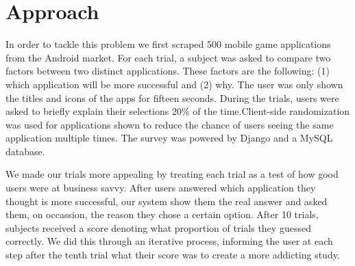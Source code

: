 \section{Approach}

In order to tackle this problem we first scraped 500 mobile game applications from the Android market. For each trial, a subject was asked to compare two factors between two distinct applications. These factors are the following: (1) which application will be more successful and (2) why. The user was only shown the titles and icons of the apps for fifteen seconds. During the trials, users were asked to briefly explain their selections 20\% of the time.Client-side randomization was used for applications shown to reduce the chance of users seeing the same application multiple times. The survey was powered by Django and a MySQL database.

We made our trials more appealing by treating each trial as a test of how good users were at business savvy. After users answered which application they thought is more successful, our system show them the real answer and asked them, on occassion, the reason they chose a certain option. After 10 trials, subjects received a score denoting what proportion of trials they guessed correctly. We did this through an iterative process, informing the user at each step after the tenth trial what their score was to create a more addicting study.


